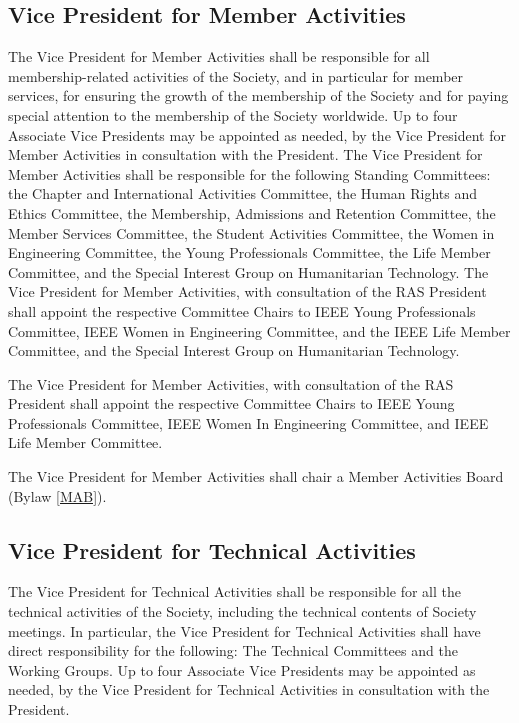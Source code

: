 \documentclass[10pt]{article}
\newcommand{\blref}[1]{Bylaw \ref{#1}}
\begin{document}
\subsection{Vice President for Member Activities}
The Vice President for Member Activities shall be responsible for all membership-related activities of the Society, and in particular for member services, for ensuring the growth of the membership of the Society and for paying special attention to the membership of the Society worldwide. Up to four Associate Vice Presidents may be appointed as needed, by the Vice President for Member Activities in consultation with the President. The Vice President for Member Activities shall be responsible for the following Standing Committees: the Chapter and International Activities Committee, the Human Rights and Ethics Committee, the Membership, Admissions and Retention Committee, the Member Services Committee, the Student Activities Committee, the Women in Engineering Committee, the Young Professionals Committee, the Life Member Committee, and the Special Interest Group on Humanitarian Technology. The Vice President for Member Activities, with consultation of the RAS President shall appoint the respective Committee Chairs to IEEE Young Professionals Committee, IEEE Women in Engineering Committee, and the IEEE Life Member Committee, and the Special Interest Group on Humanitarian Technology.

The Vice President for Member Activities, with consultation of the RAS President shall appoint the respective Committee Chairs to IEEE Young Professionals Committee, IEEE Women In Engineering Committee, and IEEE Life Member Committee.

The Vice President for Member Activities shall chair a Member Activities Board (\blref{MAB}). 



\subsection{Vice President for Technical Activities}
The Vice President for Technical Activities shall be responsible for all the technical activities of the Society, including the technical contents of Society meetings. In particular, the Vice President for Technical Activities shall have direct responsibility for the following: The Technical Committees and the Working Groups. Up to four Associate Vice Presidents may be appointed as needed, by the Vice President for Technical Activities in consultation with the President.
\end{document}
